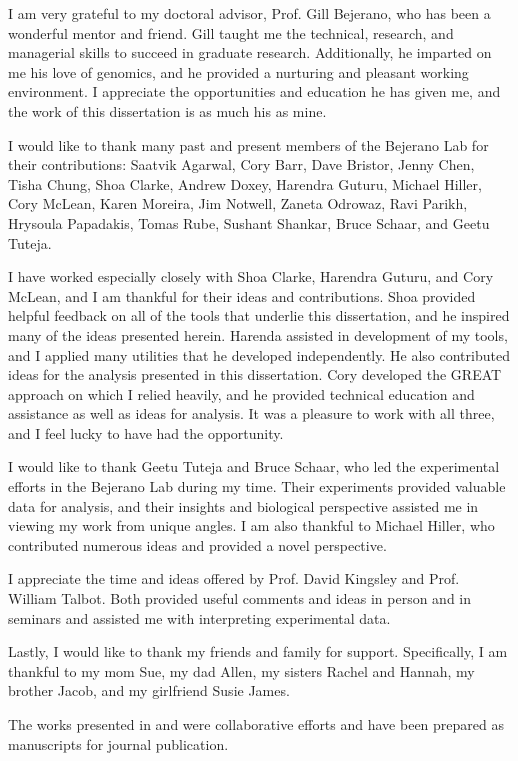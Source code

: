 I am very grateful to my doctoral advisor, Prof. Gill Bejerano, who has been a wonderful mentor and friend.  Gill taught
me the technical, research, and managerial skills to succeed in graduate research.  Additionally, he imparted on
me his love of genomics, and he provided a nurturing and pleasant working environment.  I appreciate the opportunities and
education he has given me, and the work of this dissertation is as much his as mine.
%

I would like to thank many past and present members of the Bejerano Lab for their contributions: Saatvik Agarwal, Cory Barr,
Dave Bristor, Jenny Chen, Tisha Chung, Shoa Clarke, Andrew Doxey, Harendra Guturu, Michael Hiller, Cory McLean, Karen Moreira,
Jim Notwell, Zaneta Odrowaz, Ravi Parikh, Hrysoula Papadakis, Tomas Rube, Sushant Shankar, Bruce Schaar, and Geetu Tuteja.
%

I have worked especially closely with Shoa Clarke, Harendra Guturu, and Cory McLean, and I am thankful for their ideas
and contributions.  Shoa provided helpful feedback on all of the tools that underlie this dissertation, and he inspired many of
the ideas presented herein.  Harenda assisted in development of my tools, and I applied many utilities that he developed
independently.  He also contributed ideas for the analysis presented in this dissertation.  Cory developed the GREAT
approach on which I relied heavily, and he provided technical education and assistance as well as ideas for analysis.
It was a pleasure to work with all three, and I feel lucky to have had the opportunity.
%

I would like to thank Geetu Tuteja and Bruce Schaar, who led the experimental efforts in the Bejerano Lab during my time.
Their experiments provided valuable data for analysis, and their insights and biological perspective assisted me in viewing
my work from unique angles.  I am also thankful to Michael Hiller, who contributed numerous ideas and provided a novel
perspective.
%

I appreciate the time and ideas offered by Prof. David Kingsley and Prof. William Talbot.  Both provided useful comments
and ideas in person and in seminars and assisted me with interpreting experimental data.
%

Lastly, I would like to thank my friends and family for support.  Specifically, I am thankful to my mom Sue, my dad
Allen, my sisters Rachel and Hannah, my brother Jacob, and my girlfriend Susie James.
%

The works presented in  and  were collaborative efforts and have
been prepared as manuscripts for journal publication.
%

